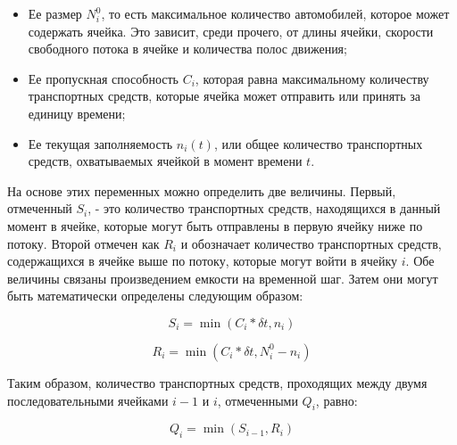 \begin{itemize}
    \item Ее размер $N_i^0$, то есть максимальное количество автомобилей, которое может содержать ячейка. Это зависит, среди прочего, от длины ячейки, скорости свободного потока в ячейке и количества полос движения;
    \item Ее пропускная способность $C_i$, которая равна максимальному количеству транспортных средств, которые ячейка может отправить или принять за единицу времени;
    \item Ее текущая заполняемость $n_i(t)$, или общее количество транспортных средств, охватываемых ячейкой в момент времени $t$.
\end{itemize}


На основе этих переменных можно определить две величины. Первый, отмеченный $S_i$, - это количество транспортных средств, находящихся в данный момент в ячейке, которые могут быть отправлены в первую ячейку ниже по потоку. Второй отмечен как $R_i$ и обозначает количество транспортных средств, содержащихся в ячейке выше по потоку, которые могут войти в ячейку $i$. Обе величины связаны произведением емкости на временной шаг. Затем они могут быть математически определены следующим образом:

\begin{equation}
    \label{eqn:Si}
    S_i = \min(C_i * \delta t, n_i)
\end{equation}

\begin{equation}
    \label{eqn:Ri}
    R_i = \min(C_i * \delta t, N_i^0 − n_i)
\end{equation}


Таким образом, количество транспортных средств, проходящих между двумя последовательными ячейками $i−1$ и $i$, отмеченными $Q_i$, равно:

\begin{equation}
    \label{eqn:Qi}
    Q_i = \min(S_{i−1},R_i)
\end{equation}

